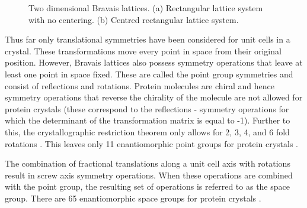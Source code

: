 \begin{figure}
\begin{subfigure}[b]{0.45\textwidth}
                    \caption{}
                    \label{fig:2D centred rectangular Bravais lattice}
            \end{subfigure}
            \caption{Two dimensional Bravais lattices. (a) Rectangular lattice system with no centering. (b) Centred rectangular lattice system.}
    		\label{fig:2D Bravais lattices}
        \end{figure}

        Thus far only translational symmetries have been considered for unit cells in a crystal. These transformations move every point in space from their original position. However, Bravais lattices also possess symmetry operations that leave at least one point in space fixed. These are called the point group symmetries and consist of reflections and rotations. Protein molecules are chiral and hence symmetry operations that reverse the chirality of the molecule are not allowed for protein crystals (these correspond to the reflections - symmetry operations for which the determinant of the transformation matrix is equal to -1). Further to this, the crystallographic restriction theorem only allows for 2, 3, 4, and 6 fold rotations \cite[p~63]{coxeter1973regular}. This leaves only 11 enantiomorphic point groups for protein crystals \cite{drenth2012}.

        The combination of fractional translations along a unit cell axis with rotations result in screw axis symmetry operations. When these operations are combined with the point group, the resulting set of operations is referred to as the space group. There are 65 enantiomorphic space groups for protein crystals \cite{drenth2012}.

